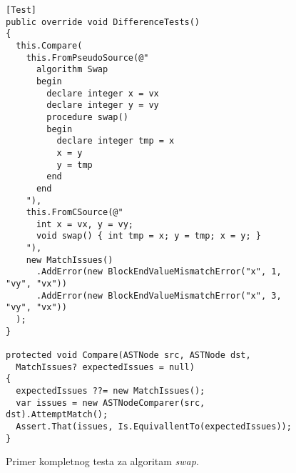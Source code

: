 \begin{figure}[h!]
\centering
\begin{lstlisting}
[Test]
public override void DifferenceTests()
{
  this.Compare(
    this.FromPseudoSource(@"
      algorithm Swap 
      begin
        declare integer x = vx
        declare integer y = vy
        procedure swap()
        begin
          declare integer tmp = x
          x = y  
          y = tmp
        end
      end
    "),
    this.FromCSource(@"
      int x = vx, y = vy;
      void swap() { int tmp = x; y = tmp; x = y; }
    "),
    new MatchIssues()
      .AddError(new BlockEndValueMismatchError("x", 1, "vy", "vx"))
      .AddError(new BlockEndValueMismatchError("x", 3, "vy", "vx"))
  );
}

protected void Compare(ASTNode src, ASTNode dst, 
  MatchIssues? expectedIssues = null) 
{
  expectedIssues ??= new MatchIssues();
  var issues = new ASTNodeComparer(src, dst).AttemptMatch();
  Assert.That(issues, Is.EquivallentTo(expectedIssues));
}
\end{lstlisting}
\caption{Primer kompletnog testa za algoritam \emph{swap}.}
\label{fig:ImplTestsIntegration}
\end{figure}
